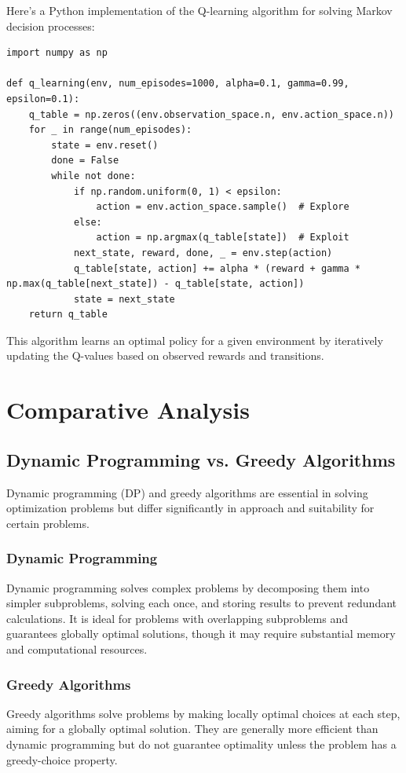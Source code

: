 \documentclass[12pt]{book} %
\begin{document}
Here's a Python implementation of the Q-learning algorithm for solving Markov decision processes:
\FloatBarrier
\begin{lstlisting}
import numpy as np

def q_learning(env, num_episodes=1000, alpha=0.1, gamma=0.99, epsilon=0.1):
    q_table = np.zeros((env.observation_space.n, env.action_space.n))
    for _ in range(num_episodes):
        state = env.reset()
        done = False
        while not done:
            if np.random.uniform(0, 1) < epsilon:
                action = env.action_space.sample()  # Explore
            else:
                action = np.argmax(q_table[state])  # Exploit
            next_state, reward, done, _ = env.step(action)
            q_table[state, action] += alpha * (reward + gamma * np.max(q_table[next_state]) - q_table[state, action])
            state = next_state
    return q_table
\end{lstlisting}
\FloatBarrier
This algorithm learns an optimal policy for a given environment by iteratively updating the Q-values based on observed rewards and transitions.


\section{Comparative Analysis}

\subsection{Dynamic Programming vs. Greedy Algorithms}

Dynamic programming (DP) and greedy algorithms are essential in solving optimization problems but differ significantly in approach and suitability for certain problems.

\subsubsection{Dynamic Programming}
Dynamic programming solves complex problems by decomposing them into simpler subproblems, solving each once, and storing results to prevent redundant calculations. It is ideal for problems with overlapping subproblems and guarantees globally optimal solutions, though it may require substantial memory and computational resources.

\subsubsection{Greedy Algorithms}
Greedy algorithms solve problems by making locally optimal choices at each step, aiming for a globally optimal solution. They are generally more efficient than dynamic programming but do not guarantee optimality unless the problem has a greedy-choice property.
\end{document}

